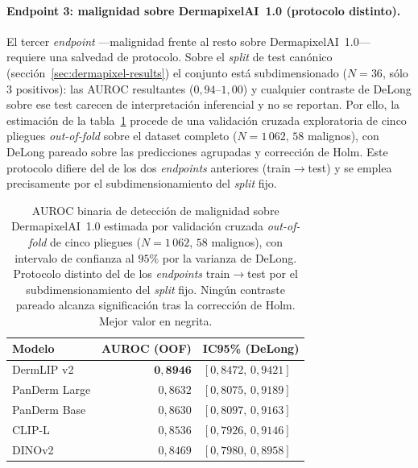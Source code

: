 \paragraph{Endpoint 3: malignidad sobre DermapixelAI~1.0 (protocolo
distinto).} El tercer \emph{endpoint} ---malignidad frente al resto
sobre DermapixelAI~1.0--- requiere una salvedad de protocolo. Sobre el
\emph{split} de test canónico (sección~\ref{sec:dermapixel-results}) el
conjunto está subdimensionado ($N = 36$, sólo $3$ positivos): las AUROC
resultantes ($0{,}94$--$1{,}00$) y cualquier contraste de DeLong sobre
ese test carecen de interpretación inferencial y no se reportan. Por
ello, la estimación de la tabla~\ref{tab:delong-dermapixel} procede de
una validación cruzada exploratoria de cinco pliegues
\emph{out-of-fold} sobre el dataset completo ($N = 1\,062$, $58$
malignos), con DeLong pareado sobre las predicciones agrupadas y
corrección de Holm. Este protocolo difiere del de los dos
\emph{endpoints} anteriores (train$\to$test) y se emplea precisamente
por el subdimensionamiento del \emph{split} fijo.

\begin{table}[H]
\centering
\footnotesize
\setlength{\tabcolsep}{4pt}
\renewcommand{\arraystretch}{0.95}
\caption{AUROC binaria de detección de malignidad sobre DermapixelAI~1.0
estimada por validación cruzada \emph{out-of-fold} de cinco pliegues
($N = 1\,062$, $58$ malignos), con intervalo de confianza al $95\%$ por
la varianza de DeLong. Protocolo distinto del de los \emph{endpoints}
train$\to$test por el subdimensionamiento del \emph{split} fijo. Ningún
contraste pareado alcanza significación tras la corrección de Holm.
Mejor valor en negrita.}
\label{tab:delong-dermapixel}
\begin{tabular}{lrl}
\hline
Modelo          & AUROC (OOF)         & IC95\% (DeLong) \\
\hline
DermLIP v2      & $\mathbf{0{,}8946}$ & $[0{,}8472,\, 0{,}9421]$ \\
PanDerm Large   & $0{,}8632$          & $[0{,}8075,\, 0{,}9189]$ \\
PanDerm Base    & $0{,}8630$          & $[0{,}8097,\, 0{,}9163]$ \\
CLIP-L          & $0{,}8536$          & $[0{,}7926,\, 0{,}9146]$ \\
DINOv2          & $0{,}8469$          & $[0{,}7980,\, 0{,}8958]$ \\
\hline
\end{tabular}
\end{table}

